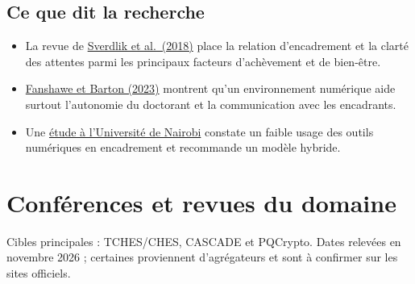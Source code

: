 \documentclass[11pt,a4paper]{article}
\begin{document}
\subsection{Ce que dit la recherche}
\begin{itemize}
  \item La revue de \href{https://doi.org/10.28945/4113}{Sverdlik et al.\ (2018)} place la
  relation d'encadrement et la clarté des attentes parmi les principaux facteurs
  d'achèvement et de bien-être.
  \item \href{https://ajet.org.au/index.php/AJET/article/download/8615/2025/30010}{Fanshawe et Barton (2023)}
  montrent qu'un environnement numérique aide surtout l'autonomie du doctorant et la
  communication avec les encadrants.
  \item Une \href{https://www.journals.eanso.org/index.php/eajes/article/view/1844}{étude à l'Université de Nairobi}
  constate un faible usage des outils numériques en encadrement et recommande un
  modèle hybride.
\end{itemize}

\section{Conférences et revues du domaine}

Cibles principales : TCHES/CHES, CASCADE et PQCrypto. Dates relevées en novembre 2026 ;
certaines proviennent d'agrégateurs et sont à confirmer sur les sites officiels.
\end{document}
